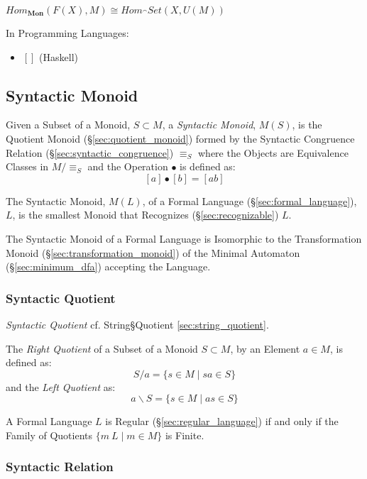 $Hom_\mathbf{Mon}(F(X), M) \cong Hom_\cat{Set}(X, U(M))$

In Programming Languages:

\begin{itemize}
  \item $\mathtt{[]}$ (Haskell)
\end{itemize}



\subsection{Syntactic Monoid}\label{sec:syntactic_monoid}

Given a Subset of a Monoid, $S \subset M$, a \emph{Syntactic Monoid},
$M(S)$, is the Quotient Monoid (\S\ref{sec:quotient_monoid}) formed by
the Syntactic Congruence Relation (\S\ref{sec:syntactic_congruence})
$\equiv_S$ where the Objects are Equivalence Classes in $M / \equiv_S$
and the Operation $\bullet$ is defined as:
\[
  [a] \bullet [b] = [ab]
\]

The Syntactic Monoid, $M(L)$, of a Formal Language
(\S\ref{sec:formal_language}), $L$, is the smallest Monoid that
Recognizes (\S\ref{sec:recognizable}) $L$.

The Syntactic Monoid of a Formal Language is Isomorphic to the
Transformation Monoid (\S\ref{sec:transformation_monoid}) of the
Minimal Automaton (\S\ref{sec:minimum_dfa}) accepting the Language.



\subsubsection{Syntactic Quotient}\label{sec:syntactic_quotient}

\emph{Syntactic Quotient} cf. String\S Quotient
\ref{sec:string_quotient}.

The \emph{Right Quotient} of a Subset of a Monoid $S \subset M$, by an
Element $a \in M$, is defined as:
\[
  S / a = \{ s \in M\;|\;sa \in S \}
\]
and the \emph{Left Quotient} as:
\[
  a \backslash S = \{ s \in M\;|\;as \in S \}
\]

A Formal Language $L$ is Regular (\S\ref{sec:regular_language}) if and
only if the Family of Quotients $\{ m \ L \;|\; m \in M \}$ is Finite.



\subsubsection{Syntactic Relation}\label{sec:syntactic_relation}


